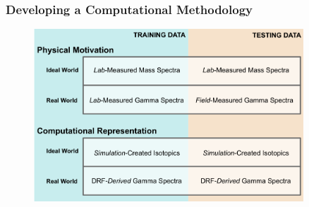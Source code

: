 \begin{frame}
  \frametitle{Developing a Computational Methodology} %
  \begin{figure}[h!]
    \centering
    \includegraphics[width=0.9\textwidth]{./figures/project_design.png}
  \end{figure}
\end{frame}

